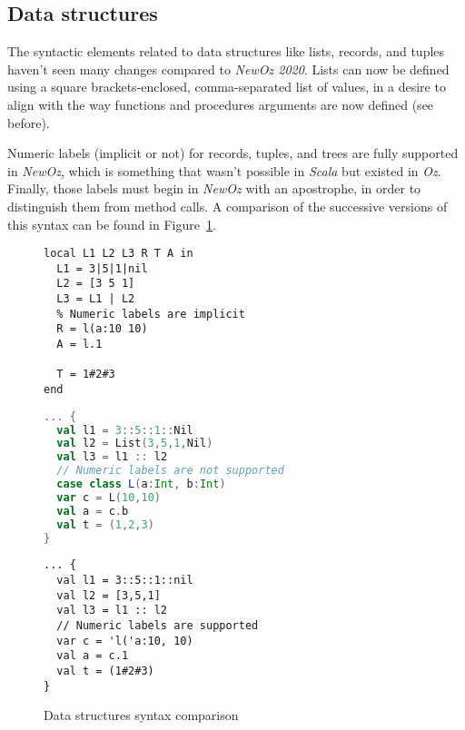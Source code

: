 \subsection{Data structures}
The syntactic elements related to data structures like lists, records, and tuples haven't seen many changes compared to \textit{NewOz 2020}.
Lists can now be defined using a square brackets-enclosed, comma-separated list of values, in a desire to align with the way functions and procedures arguments are now defined (see before).\newline

Numeric labels (implicit or not) for records, tuples, and trees are fully supported in \textit{NewOz}, which is something that wasn't possible in \textit{Scala} but existed in \textit{Oz}.
Finally, those labels must begin in \textit{NewOz} with an apostrophe, in order to distinguish them from method calls.\newline
A comparison of the successive versions of this syntax can be found in Figure~\ref{fig:code-comp-data}.
\begin{figure}[t]
    \noindent\begin{minipage}{.49\textwidth}
        \begin{lstlisting}[title={Oz},language=oz]
local L1 L2 L3 R T A in
  L1 = 3|5|1|nil
  L2 = [3 5 1]
  L3 = L1 | L2
  % Numeric labels are implicit
  R = l(a:10 10)
  A = l.1

  T = 1#2#3
end
        \end{lstlisting}
    \end{minipage}
    \hfill
    \noindent\begin{minipage}{.49\textwidth}
        \begin{lstlisting}[title={Scala/Ozma},language=scala]
... {
  val l1 = 3::5::1::Nil
  val l2 = List(3,5,1,Nil)
  val l3 = l1 :: l2
  // Numeric labels are not supported
  case class L(a:Int, b:Int)
  var c = L(10,10)
  val a = c.b
  val t = (1,2,3)
}
        \end{lstlisting}
    \end{minipage}
    \begin{center}
    \noindent\begin{minipage}{.89\textwidth}
        \begin{lstlisting}[title={NewOz 2020/2021},language=newoz]
... {
  val l1 = 3::5::1::nil
  val l2 = [3,5,1]
  val l3 = l1 :: l2
  // Numeric labels are supported
  var c = 'l('a:10, 10)
  val a = c.1
  val t = (1#2#3)
}
        \end{lstlisting}
    \end{minipage}
    \end{center}
\caption{Data structures syntax comparison}
\label{fig:code-comp-data}
\end{figure}

